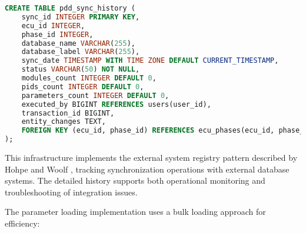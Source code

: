 \begin{lstlisting}[language=SQL, caption={Synchronization Tracking Implementation}, label={lst:sync-tracking}]
CREATE TABLE pdd_sync_history (
    sync_id INTEGER PRIMARY KEY,
    ecu_id INTEGER,
    phase_id INTEGER,
    database_name VARCHAR(255),
    database_label VARCHAR(255),
    sync_date TIMESTAMP WITH TIME ZONE DEFAULT CURRENT_TIMESTAMP,
    status VARCHAR(50) NOT NULL,
    modules_count INTEGER DEFAULT 0,
    pids_count INTEGER DEFAULT 0,
    parameters_count INTEGER DEFAULT 0,
    executed_by BIGINT REFERENCES users(user_id),
    transaction_id BIGINT,
    entity_changes TEXT,
    FOREIGN KEY (ecu_id, phase_id) REFERENCES ecu_phases(ecu_id, phase_id)
);
\end{lstlisting}

This infrastructure implements the external system registry pattern described by Hohpe and Woolf \cite{hohpe2002enterprise}, tracking synchronization operations with external database systems. The detailed history supports both operational monitoring and troubleshooting of integration issues.

The parameter loading implementation uses a bulk loading approach for efficiency:

